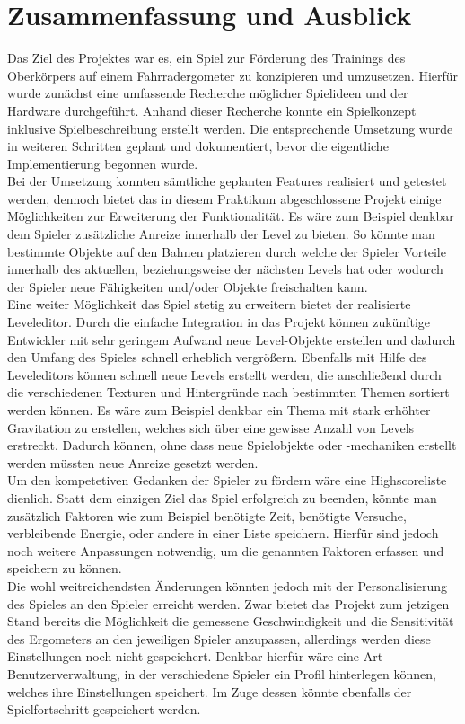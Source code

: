 \chapter{Zusammenfassung und Ausblick}
Das Ziel des Projektes war es, ein Spiel zur Förderung des Trainings des Oberkörpers auf einem Fahrradergometer zu konzipieren und umzusetzen. Hierfür wurde zunächst eine umfassende Recherche möglicher Spielideen und der Hardware durchgeführt. Anhand dieser Recherche konnte ein Spielkonzept inklusive Spielbeschreibung erstellt werden. Die entsprechende Umsetzung wurde in weiteren Schritten geplant und dokumentiert, bevor die eigentliche Implementierung begonnen wurde. \\
Bei der Umsetzung konnten sämtliche geplanten Features realisiert und getestet werden, dennoch bietet das in diesem Praktikum abgeschlossene Projekt einige Möglichkeiten zur Erweiterung der Funktionalität. Es wäre zum Beispiel denkbar dem Spieler zusätzliche Anreize innerhalb der Level zu bieten. So könnte man bestimmte Objekte auf den Bahnen platzieren durch welche der Spieler Vorteile innerhalb des aktuellen, beziehungsweise der nächsten Levels hat oder wodurch der Spieler neue Fähigkeiten und/oder Objekte freischalten kann. \\
Eine weiter Möglichkeit das Spiel stetig zu erweitern bietet der realisierte Leveleditor. Durch die einfache Integration in das Projekt können zukünftige Entwickler mit sehr geringem Aufwand neue Level-Objekte erstellen und dadurch den Umfang des Spieles schnell erheblich vergrößern. Ebenfalls mit Hilfe des Leveleditors können schnell neue Levels erstellt werden, die anschließend durch die verschiedenen Texturen und Hintergründe nach bestimmten Themen sortiert werden können. Es wäre zum Beispiel denkbar ein Thema mit stark erhöhter Gravitation zu erstellen, welches sich über eine gewisse Anzahl von Levels erstreckt. Dadurch können, ohne dass neue Spielobjekte oder -mechaniken erstellt werden müssten neue Anreize gesetzt werden.\\
Um den kompetetiven Gedanken der Spieler zu fördern wäre eine Highscoreliste dienlich. Statt dem einzigen Ziel das Spiel erfolgreich zu beenden, könnte man zusätzlich Faktoren wie zum Beispiel benötigte Zeit, benötigte Versuche, verbleibende Energie, oder andere in einer Liste speichern. Hierfür sind jedoch noch weitere Anpassungen notwendig, um die genannten Faktoren erfassen und speichern zu können.\\
Die wohl weitreichendsten Änderungen könnten jedoch mit der Personalisierung des Spieles an den Spieler erreicht werden. Zwar bietet das Projekt zum jetzigen Stand bereits die Möglichkeit die gemessene Geschwindigkeit und die Sensitivität des Ergometers an den jeweiligen Spieler anzupassen, allerdings werden diese Einstellungen noch nicht gespeichert. Denkbar hierfür wäre eine Art Benutzerverwaltung, in der verschiedene Spieler ein Profil hinterlegen können, welches ihre Einstellungen speichert. Im Zuge dessen könnte ebenfalls der Spielfortschritt gespeichert werden. \\
